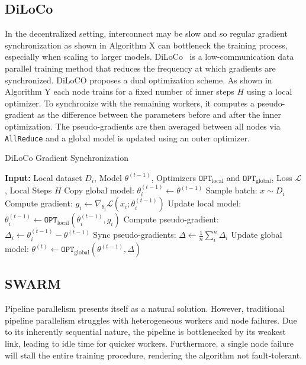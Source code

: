 \documentclass{article}
\begin{document}
\subsection{DiLoCo}

In the decentralized setting, interconnect may be slow and so regular gradient
synchronization as shown in Algorithm X can bottleneck the training process,
especially when scaling to larger models. DiLoCo~\cite{douillard2023} is a
low-communication data parallel training method that reduces the frequency at
which gradients are synchronized. DiLoCO proposes a dual optimization scheme.
As shown in Algorithm Y each node trains for a fixed number of inner steps $H$
using a local optimizer. To synchronize with the remaining workers, it computes
a pseudo-gradient as the difference between the parameters before and after the
inner optimization. The pseudo-gradients are then averaged between all nodes via
\texttt{AllReduce} and a global model is updated using an outer optimizer. 

\begin{algorithm}
\caption{DiLoCo Gradient Synchronization}
\label{alg:diloco}
\begin{algorithmic}[1]
\STATE \textbf{Input:} Local dataset $D_i$, Model $\theta^{(t-1)}$, Optimizers $\mathtt{OPT}_{\text{local}}$ and $\mathtt{OPT}_{\text{global}}$, Loss $\mathcal{L}$, Local Steps $H$ 
\STATE Copy global model: $\theta_i^{(t-1)} \gets \theta^{(t-1)}$
  \STATE Sample batch: $x \sim D_i$
  \STATE Compute gradient: $g_i \gets \nabla_{\theta_i} \mathcal{L}(x_i; \theta_i^{(t-1)})$
  \STATE Update local model: $\theta_i^{(t-1)} \gets \mathtt{OPT}_{\text{local}}(\theta_i^{(t-1)}, g_i)$
\ENDFOR
\STATE Compute pseudo-gradient: $\Delta_i \gets \theta_i^{(t-1)} - \theta^{(t-1)}$
\STATE Sync pseudo-gradients: $\Delta \gets \frac{1}{n}\sum_i^n \Delta_i$ 
\STATE Update global model: $\theta^{(t)} \gets \mathtt{OPT}_{\text{global}}(\theta^{(t-1)}, \Delta)$
\end{algorithmic}
\end{algorithm}

\subsection{SWARM}

Pipeline parallelism presents itself as a natural solution. However, traditional
pipeline parallelism struggles with heterogeneous workers and node failures. Due
to its inherently sequential nature, the pipeline is bottlenecked by its weakest
link, leading to idle time for quicker workers. Furthermore, a single node
failure will stall the entire training procedure, rendering the algorithm not
fault-tolerant.
\end{document}

